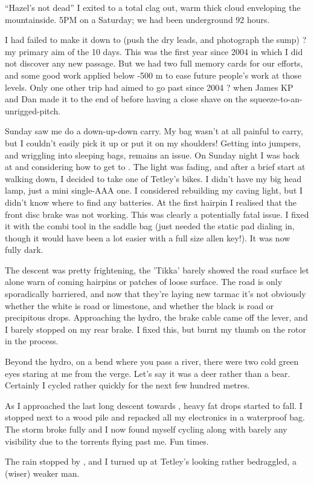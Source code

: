 ``Hazel's not dead''
I exited to a total clag out, warm thick cloud enveloping the mountainside.
5PM on a Saturday; we had been underground 92 hours.

I had failed to make it down to  (push the dry leads, and photograph the sump) ? my primary aim of the 10 days. This was the first year since 2004 in which I did not discover any new passage. But we had two full memory cards for our efforts, and some good work applied below -500 m to ease future people's work at those levels. Only one other trip had aimed to go past  since 2004 ? when James KP and Dan made it to the end of  before having a close shave on the squeeze-to-an-unrigged-pitch.

Sunday saw me do a down-up-down carry. My bag wasn't at all painful to carry, but I couldn't easily pick it up or put it on my shoulders! Getting into jumpers, and wriggling into sleeping bags, remains an issue.
On Sunday night I was back at  and considering how to get to . The light was fading, and after a brief start at walking down, I decided to take one of Tetley's bikes. I didn't have my big head lamp, just a mini single-AAA one. I considered rebuilding my caving light, but I didn't know where to find any batteries.
At the first hairpin I realised that the front disc brake was not working. This was clearly a potentially fatal issue.
I fixed it with the combi tool in the saddle bag (just needed the static pad dialing in, though it would have been a lot easier with a full size allen key!). It was now fully dark.

The descent was pretty frightening, the 'Tikka' barely showed the road surface let alone warn of coming hairpins or patches of loose surface. The road is only sporadically barriered, and now that they're laying new tarmac it's not obviously whether the white is road or limestone, and whether the black is road or precipitous drops. Approaching the hydro, the brake cable came off the lever, and I barely stopped on my rear brake. I fixed this, but burnt my thumb on the rotor in the process.

Beyond the hydro, on a bend where you pass a river, there were two cold green eyes staring at me from the verge. Let's say it was a deer rather than a bear. Certainly I cycled rather quickly for the next few hundred metres.

As I approached the last long descent towards , heavy fat drops started to fall. I stopped next to a wood pile and repacked all my electronics in a waterproof bag. The storm broke fully and I now found myself cycling along with barely any visibility due to the torrents flying past me. Fun times.

The rain stopped by , and I turned up at Tetley's looking rather bedraggled, a (wiser) weaker man.

